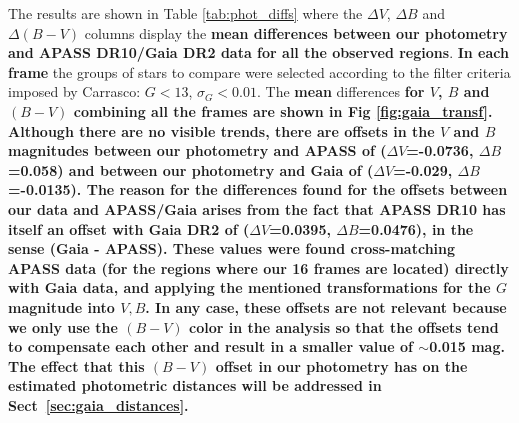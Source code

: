\documentclass[referee]{aa}
\begin{document}
The results are shown in Table \ref{tab:phot_diffs} where the $\Delta V$,
$\Delta B$ and $\Delta (B-V)$ columns display the \textbf{mean differences
between our photometry and APASS DR10/Gaia DR2 data for all the observed
regions}.
\textbf{In each frame} the groups of stars to compare were selected according
to the filter criteria imposed by Carrasco: $G<13$, $\sigma_{G}<0.01$.
%
The \textbf{mean} differences \textbf{for $V$, $B$ and $(B-V)$ combining all
the frames are shown in Fig \ref{fig:gaia_transf}. Although there are no
visible trends, there are offsets in the $V$ and $B$ magnitudes between our
photometry and APASS of ($\Delta V$=-0.0736, $\Delta B$=0.058) and between our
photometry and Gaia of ($\Delta V$=-0.029, $\Delta B$=-0.0135).
%
The reason for the differences found for the offsets between our data and
APASS/Gaia arises from the fact that APASS DR10 has itself an offset with Gaia
DR2 of ($\Delta V$=0.0395, $\Delta B$=0.0476), in the sense (Gaia - APASS).
These values were found cross-matching APASS data (for the regions where
our 16 frames are located) directly with Gaia data, and applying the mentioned
transformations for the $G$ magnitude into $V,B$.
%
In any case, these offsets are not relevant because we only use the $(B-V)$
color in the analysis so that the offsets tend to compensate each other
and result in a smaller value of $\sim$0.015 mag.
The effect that this $(B-V)$ offset in our photometry has on the estimated
photometric distances will be addressed in Sect~\ref{sec:gaia_distances}.\\
}
\end{document}
